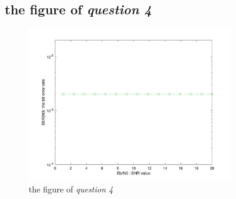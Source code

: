 \documentclass{article}
\begin{document}
\begin{CJK*}{UTF8}{bsmi}
\subsection{the figure of \emph{question 4}}
    \begin{figure}[!htb]
    \centering
    \includegraphics[width=0.8\textwidth]{4.jpg}
    \caption{\label{fig:4.jpg} the figure of \emph{question 4}}
    \end{figure}
\end{CJK*}
\end{document}
